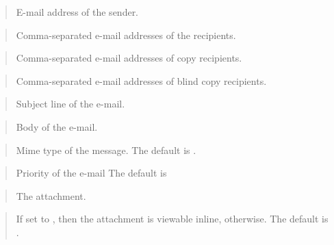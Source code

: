 \documentclass[letterpaper,10pt,english,openany,oneside]{sphinxmanual}
\begin{document}

\begin{quote}

E-mail address of the sender.
\end{quote}

\begin{quote}

Comma-separated e-mail addresses of the recipients.
\end{quote}

\begin{quote}

Comma-separated e-mail addresses of copy recipients.
\end{quote}

\begin{quote}

Comma-separated e-mail addresses of blind copy recipients.
\end{quote}

\begin{quote}

Subject line of the e-mail.
\end{quote}

\begin{quote}

Body of the e-mail.
\end{quote}

\begin{quote}

Mime type of the message. The default is .
\end{quote}

\begin{quote}

Priority of the e-mail The default is 
\end{quote}

\begin{quote}

The  attachment.
\end{quote}

\begin{quote}

If set to , then the attachment is viewable inline,  otherwise.
The default is .
\end{quote}
\end{document}
